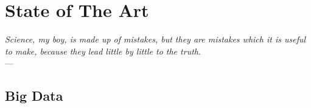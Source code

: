 \chapter{State of The Art} \label{chap:stateOfTheArt}
\begin{flushright}{\slshape    
   Science, my boy, is made up of mistakes, but they are mistakes
   which it is useful to make, because they lead little by little
   to the truth}. \\ \medskip --- \citeauthor{verne_journey:1957}
    \citeyear{verne_journey:1957}
\end{flushright} 

\section{Big Data}\label{sec:big_data}
